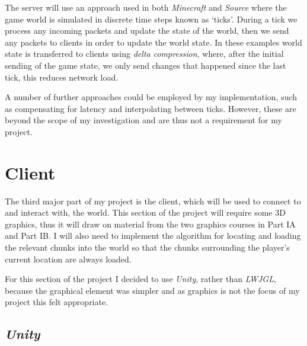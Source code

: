 \documentclass[10pt,twoside,notitlepage,a4paper]{report}
\newcommand{\unity}{\emph{Unity}}
\begin{document}
	The server will use an approach used in both \emph{Minecraft} and \emph{Source} where the game world is simulated in discrete time steps known as `ticks'. During a tick we process any incoming packets and update the state of the world, then we send any packets to clients in order to update the world state. In these examples world state is transferred to clients using \emph{delta compression}, where, after the initial sending of the game state, we only send changes that happened since the last tick, this reduces network load.
	
	A number of further approaches could be employed by my implementation, such as compensating for latency and interpolating between ticks. However, these are beyond the scope of my investigation and are thus not a requirement for my project.

	\section{Client}
	The third major part of my project is the client, which will be used to connect to and interact with, the world. This section of the project will require some 3D graphics, thus it will draw on material from the two graphics courses in Part IA and Part IB. I will also need to implement the algorithm for locating and loading the relevant chunks into the world so that the chunks surrounding the player's current location are always loaded.
	
	For this section of the project I decided to use \unity, rather than \emph{LWJGL}, because the graphical element was simpler and as graphics is not the focus of my project this felt appropriate.
	
	\subsection{\unity}
	
\end{document}
